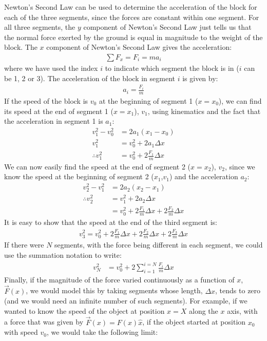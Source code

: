 Newton's Second Law can be used to determine the acceleration of the block for each of the three segments, since the forces are constant within one segment. For all three segments, the $y$ component of Newton's Second Law just tells us that the normal force exerted by the ground is equal in magnitude to the weight of the block. The $x$ component of Newton's Second Law gives the acceleration:
\begin{align*}
\sum F_x = F_i = ma_i
\end{align*}
where we have used the index $i$ to indicate which segment the block is in ($i$ can be 1, 2 or 3). The acceleration of the block in segment $i$ is given by:
\begin{align*}
a_i = \frac{F_i}{m}
\end{align*}
If the speed of the block is $v_0$ at the beginning of segment 1 ($x=x_0$), we can find its speed at the end of segment 1 ($x=x_1$), $v_1$, using kinematics and the fact that the acceleration in segment 1 is $a_1$:
\begin{align*}
v_1^2-v_0^2 &= 2a_1(x_1 - x_0)\\
v_1^2 &=v_0^2+ 2a_1\Delta x\\
\therefore v_1^2 &=v_0^2+2\frac{F_1}{m}\Delta x
\end{align*}
We can now easily find the speed at the end of segment 2 ($x=x_2$), $v_2$, since we know the speed at the beginning of segment 2 ($x_1$,$v_1$) and the acceleration $a_2$:
\begin{align*}
v_2^2 -v_1^2 &= 2a_2(x_2 - x_1)\\
\therefore v_2^2 &= v_1^2 + 2a_2\Delta x\\
&=v_0^2+ 2\frac{F_1}{m}\Delta x + 2\frac{F_2}{m}\Delta x
\end{align*}
It is easy to show that the speed at the end of the third segment is:
\begin{align*}
v_3^2 = v_0^2+ 2\frac{F_1}{m}\Delta x + 2\frac{F_2}{m}\Delta x +2\frac{F_3}{m}\Delta x
\end{align*}
If there were $N$ segments, with the force being different in each segment, we could use the summation notation to write:
\begin{align*}
v_N^2 &= v_0^2 + 2\sum_{i=1}^{i=N} \frac{F_i}{m}\Delta x
\end{align*}
Finally, if the magnitude of the force varied continuously as a function of $x$, $\vec F(x)$, we would model this by taking segments whose length, $\Delta x$, tends to zero (and we would need an infinite number of such segments). For example, if we wanted to know the speed of the object at position $x=X$ along the $x$ axis, with a force that was given by $\vec F(x)=F(x)\hat x$, if the object started at position $x_0$ with speed $v_0$, we would take the following limit:
